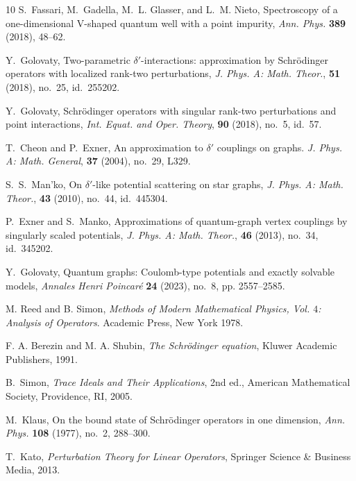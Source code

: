 \documentclass[reqno]{amsart}
\theoremstyle{definition}
\theoremstyle{remark}
\numberwithin{equation}{section}
\begin{document}
\begin{thebibliography}{10}
    S.~Fassari, M.~Gadella, M.~L. Glasser, and L.~M. Nieto,
    Spectroscopy of a one-dimensional V-shaped quantum well with a point impurity,
    \textit{Ann. Phys.} \textbf{389} (2018), 48--62.


    Y.~Golovaty,
    Two-parametric $\delta'$-interactions: approximation by Schrödinger operators with localized rank-two perturbations,
    \textit{J. Phys. A: Math. Theor.}, \textbf{51} (2018), no.~25, id.~255202.

    Y.~Golovaty,
    Schr\"odinger operators with singular rank-two perturbations and point interactions,
    \textit{Int. Equat. and Oper. Theory}, \textbf{90} (2018), no.~5, id.~57.

    T.~Cheon and P.~Exner,
    An approximation to $\delta'$ couplings on graphs.
    \textit{J. Phys. A: Math. General}, \textbf{37} (2004), no.~29, L329.

    S.~S.~Man'ko,
    On $\delta'$-like potential scattering on star graphs,
    \textit{J. Phys. A: Math. Theor.}, \textbf{43} (2010),  no.~44, id.~445304.

    P.~Exner and S.~Manko,
    Approximations of quantum-graph vertex couplings by singularly scaled potentials,
    \textit{J. Phys. A: Math. Theor.}, \textbf{46} (2013),  no.~34, id.~345202.

    Y.~Golovaty,
    Quantum graphs: Coulomb-type potentials and exactly solvable models,
    \textit{Annales Henri Poincaré} \textbf{24} (2023), no.~8, pp. 2557--2585.

    M. Reed and B.  Simon,
    {\it  Methods of Modern Mathematical Physics, Vol. $4$: Analysis of Operators}.
    Academic Press, New York 1978.

    F. A. Berezin and M. A. Shubin,
    \textit{The Schr\"{o}dinger equation},
    Kluwer Academic Publishers, 1991.

    B.~Simon,
    \textit{Trace Ideals and Their Applications},
    2nd ed., American Mathematical Society, Providence, RI, 2005.

    M.~Klaus,
    On the bound state of Schr\"odinger operators in one dimension,
    \textit{Ann. Phys.} \textbf{108} (1977), no.~2, 288--300.



    T.~Kato,
    \textit{Perturbation Theory for Linear Operators},
    Springer Science \& Business Media, 2013.


\end{thebibliography}
\end{document}
